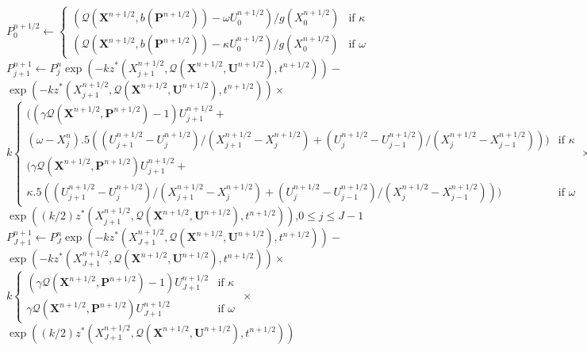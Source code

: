 \documentclass{article}
\begin{document}
\begin{algorithm}
\begin{algorithmic}
    \State $P_0^{n+1/2} \gets \begin{cases} \left(\mathcal{Q}(\mathbf{X}^{n+1/2},b(\mathbf{P}^{n+1/2})) - \omega U_0^{n+1/2} \right) / g(X_0^{n+1/2}) & \text{if } \kappa \\ \left(\mathcal{Q}(\mathbf{X}^{n+1/2},b(\mathbf{P}^{n+1/2})) - \kappa U_0^{n+1/2} \right) / g(X_0^{n+1/2}) & \text{if } \omega \end{cases}$  
    \State $P_{j+1}^{n+1} \gets P_j^n \exp\left(-k z^*(X_{j+1}^{n+1/2},\mathcal{Q}(\mathbf{X}^{n+1/2},\mathbf{U}^{n+1/2}),t^{n+1/2})\right)-$\\ \hspace{1cm} $\exp\left(-k z^*(X_{j+1}^{n+1/2},\mathcal{Q}(\mathbf{X}^{n+1/2},\mathbf{U}^{n+1/2}),t^{n+1/2})\right)\times$\\ \hspace{.5cm} $k\begin{cases}\bigg(\left(\gamma\mathcal{Q}(\mathbf{X}^{n+1/2},\mathbf{P}^{n+1/2})-1\right)U_{j+1}^{n+1/2} + \\ \left(\omega-X_j^n\right).5\left( (U_{j+1}^{n+1/2} - U_{j}^{n+1/2}) / (X_{j+1}^{n+1/2} - X_{j}^{n+1/2}) + (U_{j}^{n+1/2} - U_{j-1}^{n+1/2}) / (X_{j}^{n+1/2} - X_{j-1}^{n+1/2})\right) \bigg) & \text{if } \kappa \\  \bigg(\gamma\mathcal{Q}(\mathbf{X}^{n+1/2},\mathbf{P}^{n+1/2})U_{j+1}^{n+1/2} + \\ \kappa .5\left( (U_{j+1}^{n+1/2} - U_{j}^{n+1/2}) / (X_{j+1}^{n+1/2} - X_{j}^{n+1/2}) + (U_{j}^{n+1/2} - U_{j-1}^{n+1/2}) / (X_{j}^{n+1/2} - X_{j-1}^{n+1/2})\right) \bigg) & \text{if } \omega \end{cases}   \times$\\ \hspace{1cm} $ \exp\left((k/2)z^*(X_{j+1}^{n+1/2},\mathcal{Q}(\mathbf{X}^{n+1/2},\mathbf{U}^{n+1/2}),t^{n+1/2})\right)$\hspace{.5cm},$0 \leq j \leq J-1$
    \State $P_{J+1}^{n+1} \gets P_J^n \exp\left(-k z^*(X_{J+1}^{n+1/2},\mathcal{Q}(\mathbf{X}^{n+1/2},\mathbf{U}^{n+1/2}),t^{n+1/2})\right)-$\\ \hspace{1cm} $\exp\left(-k z^*(X_{J+1}^{n+1/2},\mathcal{Q}(\mathbf{X}^{n+1/2},\mathbf{U}^{n+1/2}),t^{n+1/2})\right)\times$\\ \hspace{1cm} $k\begin{cases}\left(\gamma\mathcal{Q}(\mathbf{X}^{n+1/2},\mathbf{P}^{n+1/2})-1\right)U_{J+1}^{n+1/2} & \text{if } \kappa \\ \gamma\mathcal{Q}(\mathbf{X}^{n+1/2},\mathbf{P}^{n+1/2})U_{J+1}^{n+1/2} & \text{if } \omega \end{cases}$\hspace{.2cm} $\times$\\ \hspace{1cm} $ \exp\left((k/2)z^*(X_{J+1}^{n+1/2},\mathcal{Q}(\mathbf{X}^{n+1/2},\mathbf{U}^{n+1/2}),t^{n+1/2})\right)$

\end{algorithmic}
\end{algorithm}
\end{document}
